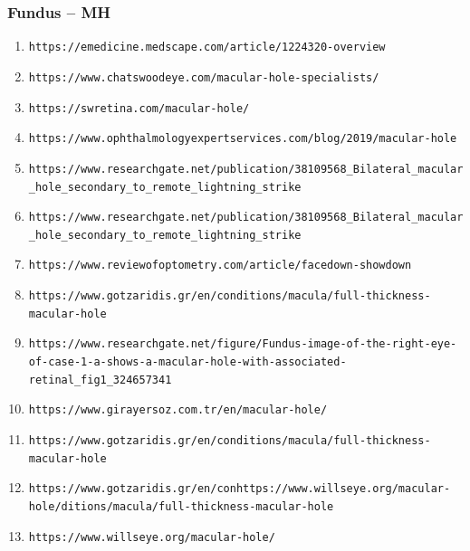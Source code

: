 \documentclass{article}
\begin{document}
	\subsubsection*{Fundus -- MH}
	\vspace{0.5cm}
	
	\begin{enumerate}
			\item \nolinkurl{https://emedicine.medscape.com/article/1224320-overview}
			
			\item \nolinkurl{https://www.chatswoodeye.com/macular-hole-specialists/}
			
			\item \nolinkurl{https://swretina.com/macular-hole/}
			
			\item \nolinkurl{https://www.ophthalmologyexpertservices.com/blog/2019/macular-hole}
			
			\item \nolinkurl{https://www.researchgate.net/publication/38109568_Bilateral_macular_hole_secondary_to_remote_lightning_strike}
			
			\item \nolinkurl{https://www.researchgate.net/publication/38109568_Bilateral_macular_hole_secondary_to_remote_lightning_strike}
			
			\item \nolinkurl{https://www.reviewofoptometry.com/article/facedown-showdown}
			
			\item \nolinkurl{https://www.gotzaridis.gr/en/conditions/macula/full-thickness-macular-hole}
			
			\item \nolinkurl{https://www.researchgate.net/figure/Fundus-image-of-the-right-eye-of-case-1-a-shows-a-macular-hole-with-associated-retinal_fig1_324657341}
			
			\item \nolinkurl{https://www.girayersoz.com.tr/en/macular-hole/}
			
			\item \nolinkurl{https://www.gotzaridis.gr/en/conditions/macula/full-thickness-macular-hole}
			
			\item \nolinkurl{https://www.gotzaridis.gr/en/conhttps://www.willseye.org/macular-hole/ditions/macula/full-thickness-macular-hole}
			
			\item \nolinkurl{https://www.willseye.org/macular-hole/}
			

\end{enumerate}
\end{document}
